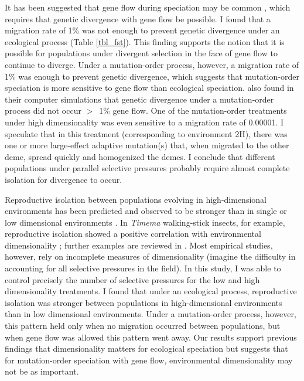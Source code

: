\begin{doublespace}
It has been suggested that gene flow during speciation
may be common \citetext{\citealt{coy04}, p. 112; \citealt{nos08}},
which requires that genetic divergence with gene flow be possible.
%
I found that a migration rate of 1\% was not enough to prevent
genetic divergence under an ecological process (Table \ref{tbl_fst}).
%
This finding supports the notion that it is possible for populations
under divergent selection in the face of gene flow to continue to diverge.
%
Under a mutation-order process, however, a migration rate of 1\%
was enough to prevent genetic divergence,
which suggests that mutation-order speciation
is more sensitive to gene flow than ecological speciation.
%
\cite{nos11} also found in their computer simulations
that genetic divergence under a mutation-order process
did not occur $>$~1\% gene flow.
%
One of the mutation-order treatments under high dimensionality
was even sensitive to a migration rate of 0.00001.
%
I speculate that in this treatment (corresponding to environment 2H),
there was one or more large-effect adaptive mutation(s) that,
when migrated to the other deme, spread quickly and homogenized the demes.
%
I conclude that different populations under parallel selective pressures
probably require almost complete isolation for divergence to occur.



Reproductive isolation between populations evolving in high-dimensional
environments has been predicted and observed to be stronger than in single or
low dimensional environments \citep{ric93,nos09,nos09b}.
%
In \emph{Timema} walking-stick insects, for example, reproductive isolation
showed a positive correlation with environmental dimensionality
\citep{nos08b,nos09b}; further examples are reviewed in \citet{nos09}.
%
Most empirical studies, however, rely on incomplete measures of dimensionality
(imagine the difficulty in accounting for all selective pressures in the field).
%
In this study, I was able to control precisely the number of selective
pressures for the low and high dimensionality treatments.
%
I found that under an ecological process, reproductive isolation was stronger
between populations in high-dimensional environments than in low dimensional
environments.
%
Under a mutation-order process, however, this pattern held only when no
migration occurred between populations, but when gene flow was allowed this
pattern went away.
%
Our results support previous findings that dimensionality matters for
ecological speciation but suggests that for mutation-order speciation with gene
flow, environmental dimensionality may not be as important.




\end{doublespace}
